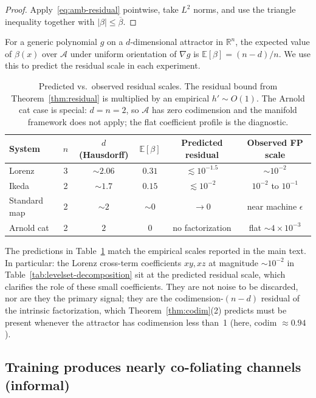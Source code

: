 \documentclass{article}
\begin{document}
\begin{proof}
Apply~\eqref{eq:amb-residual} pointwise, take $L^2$ norms, and use the
triangle inequality together with $|\beta|\le\overline\beta$.
\end{proof}

For a generic polynomial $g$ on a $d$-dimensional attractor in
$\mathbb{R}^n$, the expected value of $\beta(x)$ over $\mathcal{A}$
under uniform orientation of $\nabla g$ is
$\mathbb{E}[\beta] = (n-d)/n$. We use this to predict the residual scale
in each experiment.

\begin{table}[h]
\centering
\small
\begin{tabular}{lccccc}
\toprule
System & $n$ & $d$ (Hausdorff) & $\mathbb{E}[\beta]$ & Predicted residual & Observed FP scale \\
\midrule
Lorenz       & 3 & $\sim 2.06$ & $0.31$ & $\lesssim 10^{-1.5}$ & $\sim 10^{-2}$ \\
Ikeda        & 2 & $\sim 1.7$  & $0.15$ & $\lesssim 10^{-2}$   & $10^{-2}$ to $10^{-1}$ \\
Standard map & 2 & $\sim 2$    & $\sim 0$ & $\to 0$  & near machine $\epsilon$ \\
Arnold cat   & 2 & $2$         & $0$    & no factorization & flat $\sim 4{\times}10^{-3}$ \\
\bottomrule
\end{tabular}
\caption{Predicted vs.\ observed residual scales. The residual bound from
Theorem~\ref{thm:residual} is multiplied by an empirical $h'\sim O(1)$.
The Arnold cat case is special: $d=n=2$, so $\mathcal{A}$ has zero
codimension and the manifold framework does not apply; the flat
coefficient profile is the diagnostic.}
\label{tab:predicted-residual}
\end{table}

The predictions in Table~\ref{tab:predicted-residual} match the empirical
scales reported in the main text. In particular: the Lorenz cross-term
coefficients $xy, xz$ at magnitude $\sim 10^{-2}$ in Table~\ref{tab:levelset-decomposition}
sit at the predicted residual scale, which clarifies the role of these
small coefficients. They are not noise to be discarded, nor are they the
primary signal; they are the codimension-$(n-d)$ residual of the intrinsic
factorization, which Theorem~\ref{thm:codim}(2) predicts must be present
whenever the attractor has codimension less than~1 (here, codim
$\approx 0.94$).

\subsection{Training produces nearly co-foliating channels (informal)}
\end{document}
